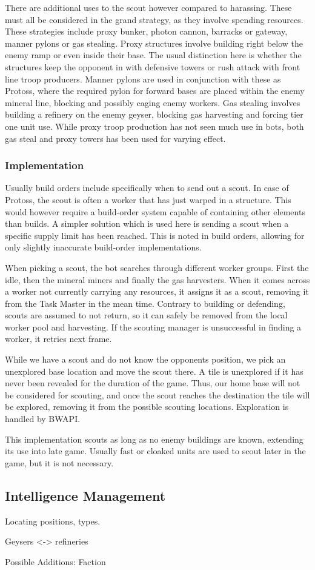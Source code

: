 	There are additional uses to the scout however compared to harassing. These must all be considered in the grand strategy, as they involve spending resources. These strategies include proxy bunker, photon cannon, barracks or gateway, manner pylons or gas stealing. Proxy structures involve building right below the enemy ramp or even inside their base. The usual distinction here is whether the structures keep the opponent in with defensive towers or rush attack with front line troop producers. Manner pylons are used in conjunction with these as Protoss, where the required pylon for forward bases are placed within the enemy mineral line, blocking and possibly caging enemy workers. Gas stealing involves building a refinery on the enemy geyser, blocking gas harvesting and forcing tier one unit use. While proxy troop production has not seen much use in bots, both gas steal and proxy towers has been used for varying effect.
	
		\subsubsection{Implementation}
		Usually build orders include specifically when to send out a scout. In case of Protoss, the scout is often a worker that has just warped in a structure. This would however require a build-order system capable of containing other elements than builds. A simpler solution which is used here is sending a scout when a specific supply limit has been reached. This is noted in build orders, allowing for only slightly inaccurate build-order implementations.
		
		When picking a scout, the bot searches through different worker groups. First the idle, then the mineral miners and finally the gas harvesters. When it comes across a worker not currently carrying any resources, it assigns it as a scout, removing it from the Task Master in the mean time. Contrary to building or defending, scouts are assumed to not return, so it can safely be removed from the local worker pool and harvesting. If the scouting manager is unsuccessful in finding a worker, it retries next frame.
		
		While we have a scout and do not know the opponents position, we pick an unexplored base location and move the scout there. A tile is unexplored if it has never been revealed for the duration of the game. Thus, our home base will not be considered for scouting, and once the scout reaches the destination the tile will be explored, removing it from the possible scouting locations. Exploration is handled by BWAPI.
		
		This implementation scouts as long as no enemy buildings are known, extending its use into late game. Usually fast or cloaked units are used to scout later in the game, but it is not necessary.
		
	\subsection{Intelligence Management}
	
	Locating positions, types.
	
	Geysers <-> refineries
	
	Possible Additions: Faction